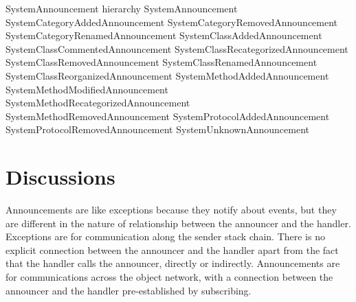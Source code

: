 \documentclass[a4paper,10pt,twoside]{book}
\begin{document}
\begin{code}{SystemAnnouncement hierarchy}
SystemAnnouncement
			SystemCategoryAddedAnnouncement
			SystemCategoryRemovedAnnouncement
			SystemCategoryRenamedAnnouncement
			SystemClassAddedAnnouncement
			SystemClassCommentedAnnouncement
			SystemClassRecategorizedAnnouncement
			SystemClassRemovedAnnouncement
			SystemClassRenamedAnnouncement
			SystemClassReorganizedAnnouncement
			SystemMethodAddedAnnouncement
			SystemMethodModifiedAnnouncement
			SystemMethodRecategorizedAnnouncement
			SystemMethodRemovedAnnouncement
			SystemProtocolAddedAnnouncement
			SystemProtocolRemovedAnnouncement
			SystemUnknownAnnouncement
\end{code}

\section{Discussions}
Announcements are like exceptions because they notify about events, but they are different in the nature of relationship between the announcer and the handler. Exceptions are for communication along the sender stack chain. There is no explicit connection between the announcer and the handler apart from the fact that the handler calls the announcer, directly or indirectly. Announcements are for communications across the object network, with a connection between the announcer and the handler pre-established by subscribing.



\ifx\wholebook\relax\else
   
   
\end{document}
